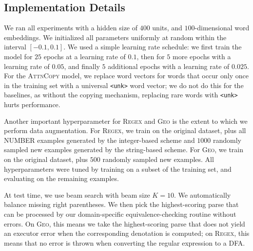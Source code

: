 \documentclass[11pt,letterpaper]{article}
\newcommand{\attncopy}{\textsc{AttnCopy}\xspace}
\newcommand{\regex}{\textsc{Regex}\xspace}
\newcommand{\geo}{\textsc{Geo}\xspace}
\begin{document}
\subsection{Implementation Details}
We ran all experiments with a hidden size of $400$ units,
and $100$-dimensional word embeddings.
We initialized all parameters uniformly at random 
within the interval $[-0.1, 0.1]$.
We used a simple learning rate schedule:
we first train the model for $25$ epochs at a learning rate of $0.1$,
then for $5$ more epochs with a learning rate of $0.05$,
and finally $5$ additional epochs with a learning rate of $0.025$.
For the \attncopy model, we replace word vectors for words
that occur only once in the training set 
with a universal \texttt{<unk>} word vector;
we do not do this for the baselines, as without the copying mechanism,
replacing rare words with \texttt{<unk>} hurts performance.

Another important hyperparameter for \regex and \geo is the
extent to which we perform data augmentation.
For \regex, we train on the original dataset,
plus all NUMBER examples generated by the integer-based scheme
and $1000$ randomly sampled new examples generated by the string-based scheme.
For \geo, we train on the original dataset,
plus $500$ randomly sampled new examples.
All hyperparameters were tuned by training on a subset of the
training set, and evaluating on the remaining examples.

At test time, we use beam search with beam size $K=10$.
We automatically balance missing right parentheses.
We then pick the highest-scoring parse 
that can be processed by our domain-specific
equivalence-checking routine without errors.
On \geo, this means we take the highest-scoring parse
that does not yield an executor error when the
corresponding denotation is computed;
on \regex, this means that no error is thrown when 
converting the regular expression to a DFA.
\end{document}
